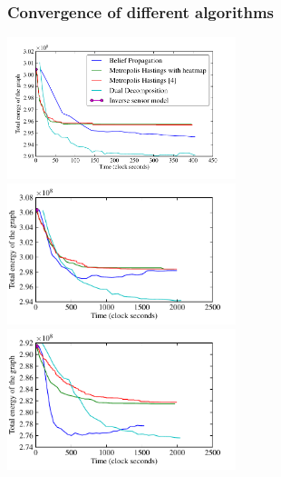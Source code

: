 \documentclass{beamer}
\begin{document}
\begin{frame}
  \frametitle{Convergence of different algorithms}
\providecommand{\mysubfloatwidth}{0.50\textwidth}
  \includegraphics[width=\mysubfloatwidth]{../Data/cave_player/plot-time-energy.pdf}%
  \includegraphics[width=\mysubfloatwidth]{../Data/hospital_section_player/plot-time-energy.pdf}\\
  \includegraphics[width=\mysubfloatwidth]{../Data/hospital_player/plot-time-energy.pdf}%

\end{frame}
\end{document}

